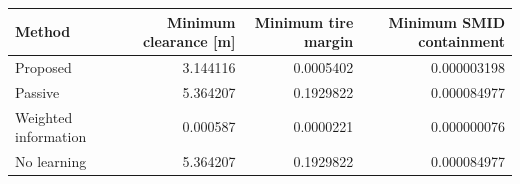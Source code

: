\begin{tabular}{lrrr}
\toprule
Method & Minimum clearance [m] & Minimum tire margin & Minimum SMID containment \\
\midrule
Proposed & 3.144116 & 0.0005402 & 0.000003198 \\
Passive & 5.364207 & 0.1929822 & 0.000084977 \\
Weighted information & 0.000587 & 0.0000221 & 0.000000076 \\
No learning & 5.364207 & 0.1929822 & 0.000084977 \\
\bottomrule
\end{tabular}
